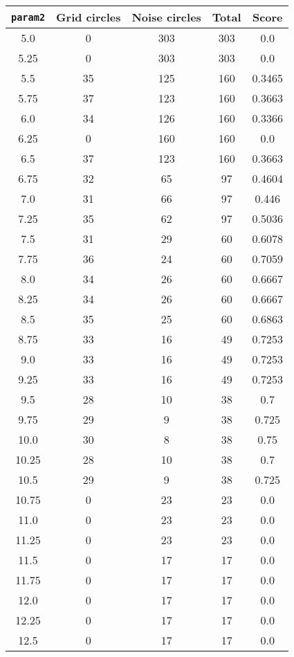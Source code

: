 \documentclass[letterpaper, 12pt]{article}
\begin{document}
\begin{longtable}{|c|c|c|c|c|}
\hline
\textbf{\texttt{param2}} & \textbf{Grid circles} & \textbf{Noise circles} & \textbf{Total} & \textbf{Score} \\
\hline
5.0 & 0 & 303 & 303 & 0.0 \\
\hline
5.25 & 0 & 303 & 303 & 0.0 \\
\hline
5.5 & 35 & 125 & 160 & 0.3465 \\
\hline
5.75 & 37 & 123 & 160 & 0.3663 \\
\hline
6.0 & 34 & 126 & 160 & 0.3366 \\
\hline
6.25 & 0 & 160 & 160 & 0.0 \\
\hline
6.5 & 37 & 123 & 160 & 0.3663 \\
\hline
6.75 & 32 & 65 & 97 & 0.4604 \\
\hline
7.0 & 31 & 66 & 97 & 0.446 \\
\hline
7.25 & 35 & 62 & 97 & 0.5036 \\
\hline
7.5 & 31 & 29 & 60 & 0.6078 \\
\hline
7.75 & 36 & 24 & 60 & 0.7059 \\
\hline
8.0 & 34 & 26 & 60 & 0.6667 \\
\hline
8.25 & 34 & 26 & 60 & 0.6667 \\
\hline
8.5 & 35 & 25 & 60 & 0.6863 \\
\hline
8.75 & 33 & 16 & 49 & 0.7253 \\
\hline
9.0 & 33 & 16 & 49 & 0.7253 \\
\hline
9.25 & 33 & 16 & 49 & 0.7253 \\
\hline
9.5 & 28 & 10 & 38 & 0.7 \\
\hline
9.75 & 29 & 9 & 38 & 0.725 \\
\hline
10.0 & 30 & 8 & 38 & 0.75 \\
\hline
10.25 & 28 & 10 & 38 & 0.7 \\
\hline
10.5 & 29 & 9 & 38 & 0.725 \\
\hline
10.75 & 0 & 23 & 23 & 0.0 \\
\hline
11.0 & 0 & 23 & 23 & 0.0 \\
\hline
11.25 & 0 & 23 & 23 & 0.0 \\
\hline
11.5 & 0 & 17 & 17 & 0.0 \\
\hline
11.75 & 0 & 17 & 17 & 0.0 \\
\hline
12.0 & 0 & 17 & 17 & 0.0 \\
\hline
12.25 & 0 & 17 & 17 & 0.0 \\
\hline
12.5 & 0 & 17 & 17 & 0.0 \\

\end{longtable}
\end{document}
